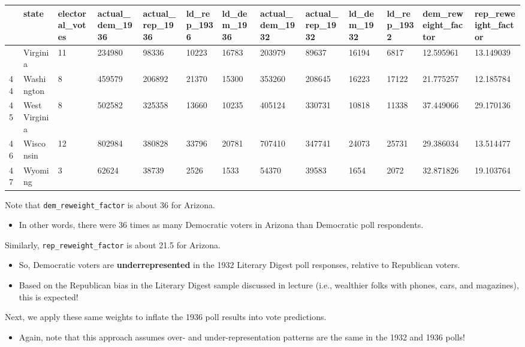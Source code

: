 \documentclass[
  letterpaper,
  DIV=11,
  numbers=noendperiod]{scrreprt}
\providecommand{\tightlist}{%
  \setlength{\itemsep}{0pt}\setlength{\parskip}{0pt}}\usepackage{longtable,booktabs,array}
\begin{document}
\begin{longtable}[]{@{}lllllllllllll@{}}
\toprule\noalign{}
& state & electoral\_votes & actual\_dem\_1936 & actual\_rep\_1936 &
ld\_rep\_1936 & ld\_dem\_1936 & actual\_dem\_1932 & actual\_rep\_1932 &
ld\_dem\_1932 & ld\_rep\_1932 & dem\_reweight\_factor &
rep\_reweight\_factor \\
\midrule\noalign{}
\endhead
\bottomrule\noalign{}
\endlastfoot
43 & Virginia & 11 & 234980 & 98336 & 10223 & 16783 & 203979 & 89637 &
16194 & 6817 & 12.595961 & 13.149039 \\
44 & Washington & 8 & 459579 & 206892 & 21370 & 15300 & 353260 & 208645
& 16223 & 17122 & 21.775257 & 12.185784 \\
45 & West Virginia & 8 & 502582 & 325358 & 13660 & 10235 & 405124 &
330731 & 10818 & 11338 & 37.449066 & 29.170136 \\
46 & Wisconsin & 12 & 802984 & 380828 & 33796 & 20781 & 707410 & 347741
& 24073 & 25731 & 29.386034 & 13.514477 \\
47 & Wyoming & 3 & 62624 & 38739 & 2526 & 1533 & 54370 & 39583 & 1654 &
2072 & 32.871826 & 19.103764 \\
\end{longtable}

Note that \texttt{dem\_reweight\_factor} is about 36 for Arizona.

\begin{itemize}
\tightlist
\item
  In other words, there were 36 times as many Democratic voters in
  Arizona than Democratic poll respondents.
\end{itemize}

Similarly, \texttt{rep\_reweight\_factor} is about 21.5 for Arizona.

\begin{itemize}
\item
  So, Democratic voters are \textbf{underrepresented} in the 1932
  Literary Digest poll responses, relative to Republican voters.
\item
  Based on the Republican bias in the Literary Digest sample discussed
  in lecture (i.e., wealthier folks with phones, cars, and magazines),
  this is expected!
\end{itemize}

Next, we apply these same weights to inflate the 1936 poll results into
vote predictions.

\begin{itemize}
\tightlist
\item
  Again, note that this approach assumes over- and under-representation
  patterns are the same in the 1932 and 1936 polls!
\end{itemize}
\end{document}
